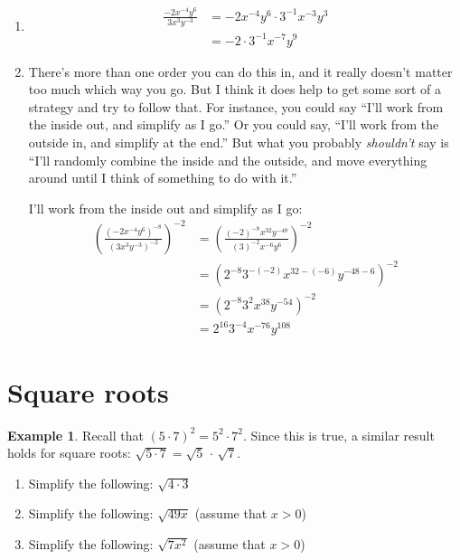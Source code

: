 \documentclass[oneside]{book}
\newcommand{\inv}{^{-1}}
\theoremstyle{definition}
\newtheorem{example}{Example}
\theoremstyle{solution}
\newtheorem*{solution}{Solution}
\newcommand{\handoutfill}{}
\newcommand{\handoutitemsep}{}
\newenvironment{solution}{\vspace{2in}\comment}{\endcomment}
\newcommand{\handoutfill}{\vfill}
\newcommand{\handoutitemsep}{\itemsep=\fill}
\begin{document}
\begin{solution}
\begin{enumerate}
\item  
\begin{align*}
\frac  {-2x^{-4}y^6}   {3x^3y^{-3}}  
& = -2x^{-4}y^6\cdot 3\inv x^{-3}y^{3}  \\
  & = -2 \cdot 3\inv x^{-7}y^9
\end{align*}

\item   There's more than one order you can do this in, and it really
  doesn't matter too much which way you go.  But I think it does help
  to get some sort of a strategy and try to follow that.  For
  instance, you could say ``I'll work from the inside out, and
  simplify as I go.''  Or you could say, ``I'll work from the outside
  in, and simplify at the end.''  But what you probably
  \emph{shouldn't} say is ``I'll randomly combine the inside and the
  outside, and move everything around until I think of something to do
  with it.''

I'll work from the inside out and simplify as I go:
\begin{align*}
\left(\frac  {(-2x^{-4}y^6)^{-8}} 
             {(3x^3y^{-3})^{-2}} \right)^{-2}
 & =\left(\frac  {(-2)^{-8} x^{32} y^{-48}} 
                 {(3)^{-2} x^{-6} y^{6}} \right)^{-2}\\
 & = \left(2^{-8} 3^{-(-2)} x^{32-(-6)} y^{-48-6}\right)^{-2}\\
 & =\left(2^{-8} 3^{2} x^{38} y^{-54}\right)^{-2}\\
 & = 2^{16} 3^{-4} x^{-76} y^{108}
\end{align*}
\end{enumerate}
\end{solution}


\section{Square roots}
\begin{example}
Recall that $(5\cdot 7)^2 = 5^2\cdot 7^2$.  Since this is true, a
similar result holds for square roots: $\sqrt{5\cdot 7} =
\sqrt{5}\,\cdot\,\sqrt{7}$.  

\begin{enumerate}
\handoutitemsep
\item Simplify the following: $\sqrt{4\cdot 3}$
\item Simplify the following: $\sqrt{49x}$ (assume that $x>0$)
\item Simplify the following: $\sqrt{7x^2}$ (assume that $x>0$)
\handoutfill
\end{enumerate}
\end{example}
\end{document}
